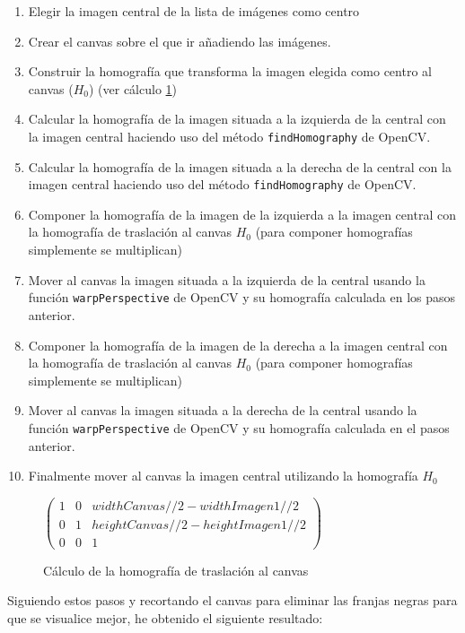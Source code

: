 \documentclass[12pt,spanish]{article}
\begin{document}
\begin{enumerate}
	\item Elegir la imagen central de la lista de imágenes como centro
	\item Crear el canvas sobre el que ir añadiendo las imágenes.
	\item Construir la homografía que transforma la imagen elegida como centro al canvas ($H_0$) (ver cálculo \ref{H0})
	\item Calcular la homografía de la imagen situada a la izquierda de la central con la imagen central haciendo uso del método \texttt{findHomography} de OpenCV.
	\item Calcular la homografía de la imagen situada a la derecha de la central con la imagen central haciendo uso del método \texttt{findHomography} de OpenCV.
	\item Componer la homografía de la imagen de la izquierda a la imagen central con la homografía de traslación al canvas $H_0$ (para componer homografías simplemente se multiplican)
	\item Mover al canvas la imagen situada a la izquierda de la central usando la función \texttt{warpPerspective} de OpenCV y su homografía calculada en los pasos anterior.
	\item Componer la homografía de la imagen de la derecha a la imagen central con la homografía de traslación al canvas $H_0$ (para componer homografías simplemente se multiplican)
	\item Mover al canvas la imagen situada a la derecha de la central 
	usando la función \texttt{warpPerspective} de OpenCV y su homografía calculada en el pasos anterior.
	\item Finalmente mover al canvas la imagen central utilizando la homografía $H_0$
\end{enumerate}


\begin{figure}[H]
			\centering
			$\begin{pmatrix}
				1 & 0 & widthCanvas//2 - widthImagen1//2   \\
				0 & 1 & heightCanvas//2 - heightImagen1//2  \\
				0 & 0 & 1
			\end{pmatrix}$
			\caption{Cálculo de la homografía de traslación al canvas}
			\label{H0}
\end{figure}

Siguiendo estos pasos y recortando el canvas para eliminar las franjas negras para que se visualice mejor, he obtenido el siguiente resultado:
\end{document}
